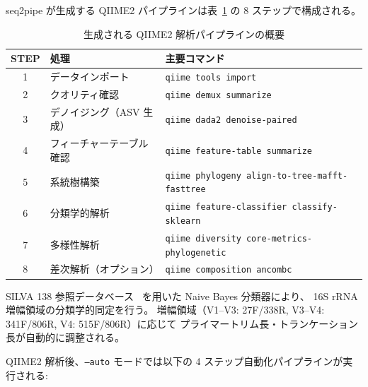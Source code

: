 \documentclass[12pt, a4paper]{article}
\begin{document}
seq2pipe が生成する QIIME2 パイプラインは表~\ref{tab:workflow} の 8 ステップで構成される。

\begin{table}[h]
  \centering
  \caption{生成される QIIME2 解析パイプラインの概要}
  \label{tab:workflow}
  \begin{tabular}{clp{7cm}}
    \toprule
    \textbf{STEP} & \textbf{処理} & \textbf{主要コマンド} \\
    \midrule
    1 & データインポート &
      \texttt{qiime tools import} \\
    2 & クオリティ確認 &
      \texttt{qiime demux summarize} \\
    3 & デノイジング（ASV 生成） &
      \texttt{qiime dada2 denoise-paired} \\
    4 & フィーチャーテーブル確認 &
      \texttt{qiime feature-table summarize} \\
    5 & 系統樹構築 &
      \texttt{qiime phylogeny align-to-tree-mafft-fasttree} \\
    6 & 分類学的解析 &
      \texttt{qiime feature-classifier classify-sklearn} \\
    7 & 多様性解析 &
      \texttt{qiime diversity core-metrics-phylogenetic} \\
    8 & 差次解析（オプション） &
      \texttt{qiime composition ancombc} \\
    \bottomrule
  \end{tabular}
\end{table}

SILVA 138 参照データベース~\cite{silva} を用いた Naive Bayes 分類器により、
16S rRNA 増幅領域の分類学的同定を行う。
増幅領域（V1--V3: 27F/338R, V3--V4: 341F/806R, V4: 515F/806R）に応じて
プライマートリム長・トランケーション長が自動的に調整される。

QIIME2 解析後、\texttt{--auto} モードでは以下の 4 ステップ自動化パイプラインが実行される:
\end{document}
